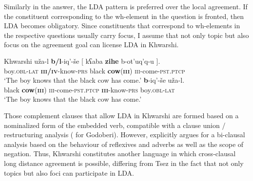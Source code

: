 \documentclass[output=paper
,modfonts
,nonflat]{langsci/langscibook}
\begin{document}
Similarly in the answer, the LDA pattern is preferred over the local agreement. If the constituent corresponding to the wh-element in the question is fronted, then LDA becomes obligatory. Since constituents that correspond to wh-elements in the respective questions usually carry focus, I assume that not only topic but also focus on the agreement goal can license LDA in Khwarshi.
\begin{exe}
\ex Khwarshi  \citep[][390]{Khalilova2008}
	\xlist
	\ex
		\gll u\v{z}a-l \textbf{b/l}-iq'-\v{s}e [ k\super ʕaba \textbf{zihe} b-ot'uq'q-u ].\\
			 boy.\textsc{obl-lat} \textbf{\textsc{iii/iv}}-know-\textsc{prs} {} black \textbf{cow}(\textbf{\textsc{iii}}) \textsc{iii}-come-\textsc{pst.ptcp} {}\\
		\glt `The boy knows that the black cow has come.'
	\ex
		 \textbf{b}-iq'-\v{s}e u\v{z}a-l.\\
			 {} black \textbf{cow}(\textbf{\textsc{iii}}) \textsc{iii}-come-\textsc{pst.ptcp} {} \textbf{\textsc{iii}}-know-\textsc{prs} boy.\textsc{obl-lat}\\
		\glt `The boy knows that the black cow has come.'	
	\endxlist
\end{exe}
Those complement clauses that allow LDA in Khwarshi are formed based on a nominalized form of the embedded verb, compatible with a clause union / restructuring analysis (\citealt{Haspelmath1999} for Godoberi). However, \citet[386-388]{Khalilova2009} explicitly argues for a bi-clausal analysis based on the behaviour of reflexives and adverbs as well as the scope of negation. Thus, Khwarshi constitutes another language in which cross-clausal long distance agreement is possible, differing from Tsez in the fact that not only topics but also foci can participate in LDA.
\end{document}
